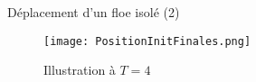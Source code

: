 \begin{frame}{Déplacement d'un floe isolé (2)}

    \begin{figure}
        \centering
        \texttt{[image: PositionInitFinales.png]}
        \caption{Illustration à $T=4$}
    \end{figure}


\end{frame}